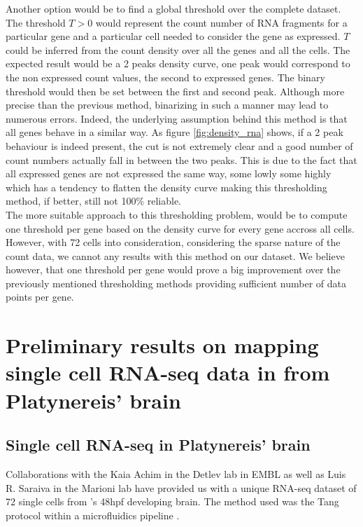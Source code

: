   Another option would be to find a global threshold over the complete dataset. The threshold $T>0$ would represent the count number of RNA fragments for a particular gene and a particular cell needed to consider the gene as expressed. $T$ could be inferred from the count density over all the genes and all the cells. The expected result would be a 2 peaks density curve, one peak would correspond to the non expressed count values, the second to expressed genes. The binary threshold would then be set between the first and second peak. Although more precise than the previous method, binarizing in such a manner may lead to numerous errors. Indeed, the underlying assumption behind this method is that all genes behave in a similar way. As figure \ref{fig:density_rna} shows, if a 2 peak behaviour is indeed present, the cut is not extremely clear and a good number of count numbers actually fall in between the two peaks. This is due to the fact that all expressed genes are not expressed the same way, some lowly some highly which has a tendency to flatten the density curve making this thresholding method, if better, still not 100\% reliable.\\
  
  The more suitable approach to this thresholding problem, would be to compute one threshold per gene based on the density curve for every gene accross all cells. However, with 72 cells into consideration, considering the sparse nature of the count data, we cannot any results with this method on our dataset. We believe however, that one threshold per gene would prove a big improvement over the previously mentioned thresholding methods providing sufficient number of data points per gene.

\section{Preliminary results on mapping single cell RNA-seq data in from Platynereis' brain}\label{sec:back_mapping_platy}
  \subsection*{Single cell RNA-seq in Platynereis' brain}
  
    	Collaborations with the Kaia Achim in the Detlev lab in EMBL as well as Luis R. Saraiva in the Marioni lab have provided us with a unique RNA-seq dataset of 72 single cells from \platy{}'s 48hpf developing brain. The method used was the Tang protocol \cite{tang09} within a microfluidics pipeline .\\
    	
